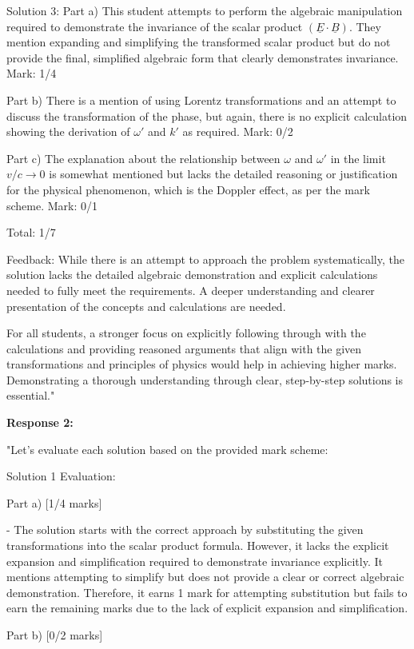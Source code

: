 \documentclass[a4paper,11pt]{article}
\begin{document}
Solution 3:
Part a) This student attempts to perform the algebraic manipulation required to demonstrate the invariance of the scalar product \((\underline{E} \cdot \underline{B})\). They mention expanding and simplifying the transformed scalar product but do not provide the final, simplified algebraic form that clearly demonstrates invariance. Mark: 1/4

Part b) There is a mention of using Lorentz transformations and an attempt to discuss the transformation of the phase, but again, there is no explicit calculation showing the derivation of \(\omega'\) and \(k'\) as required. Mark: 0/2

Part c) The explanation about the relationship between \(\omega\) and \(\omega'\) in the limit \( v/c \rightarrow 0\) is somewhat mentioned but lacks the detailed reasoning or justification for the physical phenomenon, which is the Doppler effect, as per the mark scheme. Mark: 0/1

Total: 1/7

Feedback: While there is an attempt to approach the problem systematically, the solution lacks the detailed algebraic demonstration and explicit calculations needed to fully meet the requirements. A deeper understanding and clearer presentation of the concepts and calculations are needed.

For all students, a stronger focus on explicitly following through with the calculations and providing reasoned arguments that align with the given transformations and principles of physics would help in achieving higher marks. Demonstrating a thorough understanding through clear, step-by-step solutions is essential."

\textbf{Response 2:}

"Let's evaluate each solution based on the provided mark scheme:

Solution 1 Evaluation:

Part a) [1/4 marks]

- The solution starts with the correct approach by substituting the given transformations into the scalar product formula. However, it lacks the explicit expansion and simplification required to demonstrate invariance explicitly. It mentions attempting to simplify but does not provide a clear or correct algebraic demonstration. Therefore, it earns 1 mark for attempting substitution but fails to earn the remaining marks due to the lack of explicit expansion and simplification.

Part b) [0/2 marks]
\end{document}
